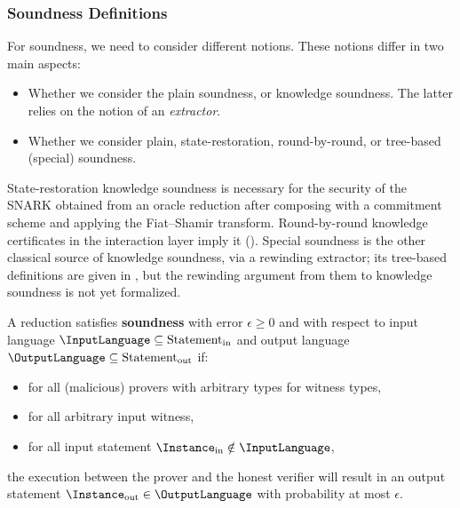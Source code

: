 \subsubsection{Soundness Definitions}

For soundness, we need to consider different notions. These notions differ in two main aspects:
\begin{itemize}
    \item Whether we consider the plain soundness, or knowledge soundness. The latter relies on the
    notion of an \emph{extractor}.
    \item Whether we consider plain, state-restoration, round-by-round, or tree-based (special)
    soundness.
\end{itemize}

State-restoration knowledge soundness is necessary for the security of the SNARK obtained from an
oracle reduction after composing with a commitment scheme and applying the Fiat--Shamir transform.
Round-by-round knowledge certificates in the interaction layer imply it
(). Special soundness is the other classical source of
knowledge soundness, via a rewinding extractor; its tree-based definitions are given in
, but the rewinding argument from them to knowledge soundness is
not yet formalized.

\begin{definition}[Soundness]
    \label{def:soundness}
    A reduction satisfies \textbf{soundness} with error \(\epsilon \geq 0\) and with respect to input
    language \(\InputLanguage \subseteq \text{Statement}_{\text{in}}\) and output language \(\OutputLanguage \subseteq \text{Statement}_{\text{out}}\) if:
    \begin{itemize}
        \item for all (malicious) provers with arbitrary types for witness types,
        \item for all arbitrary input witness,
        \item for all input statement \(\Instance_{\text{in}} \notin \InputLanguage\),
    \end{itemize}
    the execution between the prover and the honest verifier will result in an output statement
    \(\Instance_{\text{out}} \in \OutputLanguage\) with probability at most \(\epsilon\).
    \leanok
\end{definition}

